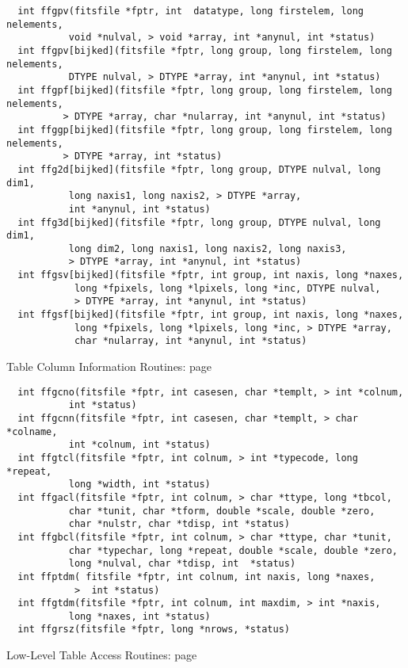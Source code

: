 \begin{verbatim}
  int ffgpv(fitsfile *fptr, int  datatype, long firstelem, long nelements,
           void *nulval, > void *array, int *anynul, int *status)
  int ffgpv[bijked](fitsfile *fptr, long group, long firstelem, long nelements,
           DTYPE nulval, > DTYPE *array, int *anynul, int *status)
  int ffgpf[bijked](fitsfile *fptr, long group, long firstelem, long nelements,
          > DTYPE *array, char *nularray, int *anynul, int *status)
  int ffggp[bijked](fitsfile *fptr, long group, long firstelem, long nelements,
          > DTYPE *array, int *status)
  int ffg2d[bijked](fitsfile *fptr, long group, DTYPE nulval, long dim1,
           long naxis1, long naxis2, > DTYPE *array,
           int *anynul, int *status)
  int ffg3d[bijked](fitsfile *fptr, long group, DTYPE nulval, long dim1,
           long dim2, long naxis1, long naxis2, long naxis3,
           > DTYPE *array, int *anynul, int *status)
  int ffgsv[bijked](fitsfile *fptr, int group, int naxis, long *naxes,
            long *fpixels, long *lpixels, long *inc, DTYPE nulval,
            > DTYPE *array, int *anynul, int *status)
  int ffgsf[bijked](fitsfile *fptr, int group, int naxis, long *naxes,
            long *fpixels, long *lpixels, long *inc, > DTYPE *array,
            char *nularray, int *anynul, int *status)
\end{verbatim}
 Table Column Information Routines: page~\pageref{FFGCNO}

\begin{verbatim}
  int ffgcno(fitsfile *fptr, int casesen, char *templt, > int *colnum,
           int *status)
  int ffgcnn(fitsfile *fptr, int casesen, char *templt, > char *colname,
           int *colnum, int *status)
  int ffgtcl(fitsfile *fptr, int colnum, > int *typecode, long *repeat,
           long *width, int *status)
  int ffgacl(fitsfile *fptr, int colnum, > char *ttype, long *tbcol,
           char *tunit, char *tform, double *scale, double *zero,
           char *nulstr, char *tdisp, int *status)
  int ffgbcl(fitsfile *fptr, int colnum, > char *ttype, char *tunit,
           char *typechar, long *repeat, double *scale, double *zero,
           long *nulval, char *tdisp, int  *status)
  int ffptdm( fitsfile *fptr, int colnum, int naxis, long *naxes,
            >  int *status)
  int ffgtdm(fitsfile *fptr, int colnum, int maxdim, > int *naxis,
           long *naxes, int *status)
  int ffgrsz(fitsfile *fptr, long *nrows, *status)
\end{verbatim}
 Low-Level Table Access Routines: page~\pageref{FFGTBB}

